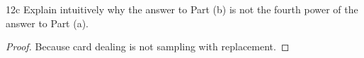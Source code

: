 \begin{exercise}{12c}
    Explain intuitively why the answer to Part (b) is not the fourth power of the answer to Part (a).
\end{exercise}

\begin{proof}
    Because card dealing is not sampling with replacement.
\end{proof}



